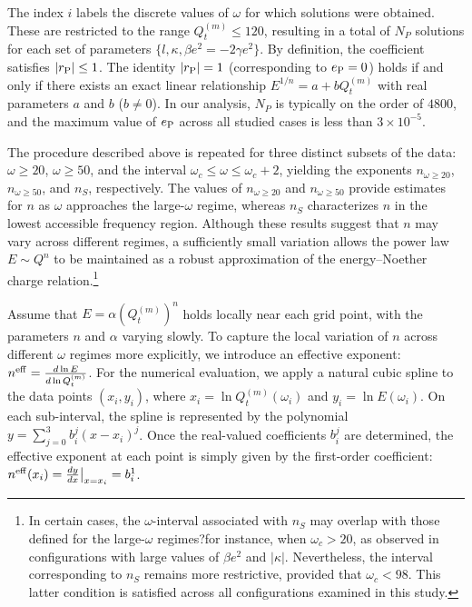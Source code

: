 \documentclass[aps,prd,superscriptaddress,notitlepage,11pt,final,longbibliography,nofootinbib]{revtex4-1}
\numberwithin{equation}{section}
\begin{document}
 The index $i$ labels the discrete values of $\omega$ for which solutions were obtained. These are restricted to the range $Q_t^{(m)} \leq 120$, resulting in a total of $N_P$ solutions for each set of parameters $\{l, \kappa, \beta e^2 = -2\gamma e^2\}$. By definition, the coefficient satisfies $|r_{\rm P}| \leq 1$. The identity $|r_{\rm P}| = 1$ (corresponding to $e_{\rm P} = 0$) holds if and only if there exists an exact linear relationship $E^{1/n} = a + b Q_t^{(m)}$ with real parameters $a$ and $b$ ($b \neq 0$). In our analysis, $N_P$ is typically on the order of $4800$, and the maximum value of $e_{\rm P}$ across all studied cases is less than $3 \times 10^{-5}$.

The procedure described above is repeated for three distinct subsets of the data: $\omega \geq 20$, $\omega \geq 50$, and the interval $\omega_c \leq \omega \leq \omega_c + 2$, yielding the exponents $n_{\omega \geq 20}$, $n_{\omega \geq 50}$, and $n_S$, respectively. The values of $n_{\omega \geq 20}$ and $n_{\omega \geq 50}$ provide estimates for $n$ as $\omega$ approaches the large-$\omega$ regime, whereas $n_S$ characterizes $n$ in the lowest accessible frequency region. Although these results suggest that $n$ may vary across different regimes, a sufficiently small variation allows the power law $E \sim Q^n$ to be maintained as a robust approximation of the energy--Noether charge relation.\footnote{In certain cases, the $\omega$-interval associated with $n_S$ may overlap with those defined for the large-$\omega$ regimes?for instance, when $\omega_c > 20$, as observed in configurations with large values of $\beta e^2$ and $|\kappa|$. Nevertheless, the interval corresponding to $n_S$ remains more restrictive, provided that $\omega_c < 98$. This latter condition is satisfied across all configurations examined in this study.}

Assume that $E = \alpha (Q_t^{(m)})^{n}$ holds locally near each grid point, with the parameters $n$ and $\alpha$ varying slowly. To capture the local variation of $n$ across different $\omega$ regimes more explicitly, we introduce an effective exponent: $n^{{\rm eff}} = \frac{d \ln E}{d \ln Q_t^{(m)}}$.
For the numerical evaluation, we apply a natural cubic spline to the data points $(x_i, y_i)$, where $x_i = \ln Q_t^{(m)}(\omega_i)$ and $y_i = \ln E(\omega_i)$. On each sub-interval, the spline is represented by the polynomial $y = \sum_{j=0}^{3} b_i^j (x - x_i)^j$. Once the real-valued coefficients $b_i^j$ are determined, the effective exponent at each point is simply given by the first-order coefficient: $n^{{\rm eff}}(x_i) = \frac{dy}{dx}\big|_{x = x_i}=b_i^1$.%
\end{document}
